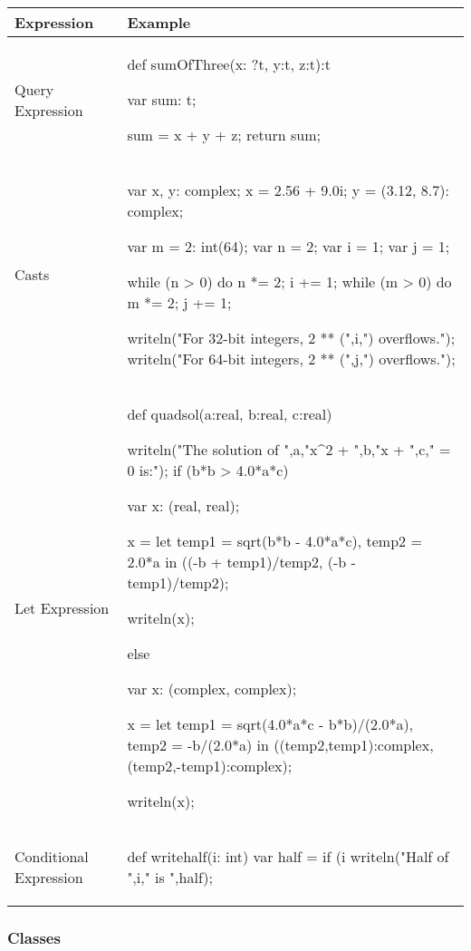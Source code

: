 \begin{center}
\begin{longtable}{|l|l|}
\hline
{\bf Expression} & {\bf Example} \\
\hline
\endhead
\hline
\endfoot
Query Expression &
\begin{chapel} %
def sumOfThree(x: ?t, y:t, z:t):t {
   var sum: t;

   sum = x + y + z;
   return sum;
}
\end{chapel} \\
\hline
Casts &
\begin{chapel} %
var x, y: complex;
x = 2.56 + 9.0i;
y = (3.12, 8.7): complex;

var m = 2: int(64);
var n = 2;
var i = 1;
var j = 1;

while (n > 0) do {
  n *= 2;
  i += 1;
}
while (m > 0) do {
  m *= 2;
  j += 1;
}

writeln("For 32-bit integers, 2 ** (",i,") overflows.");
writeln("For 64-bit integers, 2 ** (",j,") overflows.");
\end{chapel} \\
\hline
Let Expression &
\begin{chapel} %
def quadsol(a:real, b:real, c:real) {
  writeln("The solution of ",a,"x^2 + ",b,"x + ",c," = 0 is:");
  if (b*b > 4.0*a*c) {
    var x:  (real, real);

    x = let temp1 = sqrt(b*b - 4.0*a*c), temp2 = 2.0*a in
        ((-b + temp1)/temp2, (-b - temp1)/temp2);

    writeln(x);
  } else {
    var x: (complex, complex);

    x = let temp1 = sqrt(4.0*a*c - b*b)/(2.0*a), temp2 = -b/(2.0*a) in
        ((temp2,temp1):complex,(temp2,-temp1):complex);

    writeln(x);
  }
}
\end{chapel} \\
\hline
Conditional Expression &
\begin{chapel} %
def writehalf(i: int) {
  var half = if (i %
  writeln("Half of ",i," is ",half);
}
\end{chapel} \\
\hline
\end{longtable}
\end{center}

\subsubsection{Classes}
\label{Intro_Classes}

